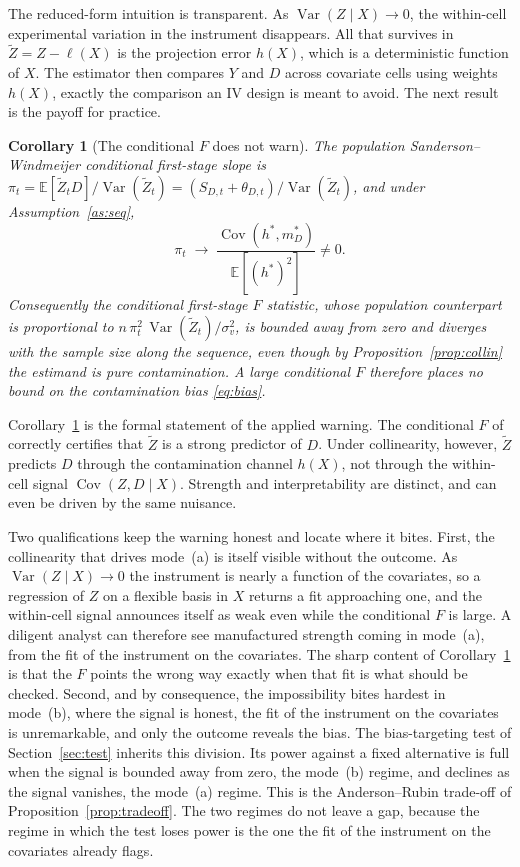 \documentclass[preprint,11pt,authoryear]{elsarticle}
\newtheorem{corollary}{Corollary}
\theoremstyle{definition}
\newcommand{\E}{\mathbb{E}}
\newcommand{\Cov}{\operatorname{Cov}}
\newcommand{\Var}{\operatorname{Var}}
\newcommand{\Ztil}{\tilde{Z}}
\begin{document}
The reduced-form intuition is transparent. As $\Var(Z\mid X)\to0$, the
within-cell experimental variation in the instrument disappears. All
that survives in $\Ztil=Z-\ell(X)$ is the projection error $h(X)$, which is a
deterministic function of $X$. The estimator then compares $Y$ and $D$ across
covariate cells using weights $h(X)$, exactly the comparison an IV design is
meant to avoid. The next result is the payoff for practice.

\begin{corollary}[The conditional $F$ does not warn]\label{cor:Ffails}
The population Sanderson--Windmeijer conditional first-stage slope is
$\pi_t=\E[\Ztil_t D]/\Var(\Ztil_t)=(S_{D,t}+\theta_{D,t})/\Var(\Ztil_t)$, and
under Assumption~\ref{as:seq},
\[
\pi_t\;\longrightarrow\;\frac{\Cov(h^\ast,m_D^\ast)}{\E[(h^\ast)^2]}\neq 0 .
\]
Consequently the conditional first-stage $F$ statistic, whose population
counterpart is proportional to $n\,\pi_t^2\,\Var(\Ztil_t)/\sigma^2_{v}$, is
bounded away from zero and diverges with the sample size along the sequence,
even though by Proposition~\ref{prop:collin} the estimand is pure contamination.
A large conditional $F$ therefore places no bound on the contamination bias
\eqref{eq:bias}.
\end{corollary}

Corollary~\ref{cor:Ffails} is the formal statement of the applied warning. The
conditional $F$ of \citet{sanderson2016} correctly certifies that $\Ztil$ is a
strong predictor of $D$. Under collinearity, however, $\Ztil$ predicts $D$
through the contamination channel $h(X)$, not through the within-cell signal
$\Cov(Z,D\mid X)$. Strength and interpretability are distinct, and can even be driven by the same nuisance.

Two qualifications keep the warning honest and locate where it bites. First, the
collinearity that drives mode~(a) is itself visible without the outcome. As
$\Var(Z\mid X)\to0$ the instrument is nearly a function of the covariates, so a
regression of $Z$ on a flexible basis in $X$ returns a fit approaching one, and the
within-cell signal announces itself as weak even while the conditional $F$ is large. A
diligent analyst can therefore see manufactured strength coming in mode~(a), from the
fit of the instrument on the covariates. The sharp content of Corollary~\ref{cor:Ffails}
is that the $F$ points the wrong way exactly when that fit is what should be checked.
Second, and by consequence, the impossibility bites hardest in mode~(b), where the signal is honest,
the fit of the instrument on the covariates is unremarkable, and only the outcome reveals the bias.
The bias-targeting test of Section~\ref{sec:test} inherits this division. Its power
against a fixed alternative is full when the signal is bounded away from zero, the
mode~(b) regime, and declines as the signal vanishes, the mode~(a) regime. This is the
Anderson--Rubin trade-off of Proposition~\ref{prop:tradeoff}. The two regimes do not
leave a gap, because the regime in which the test loses power is the one the fit of the
instrument on the covariates already flags.
\end{document}
